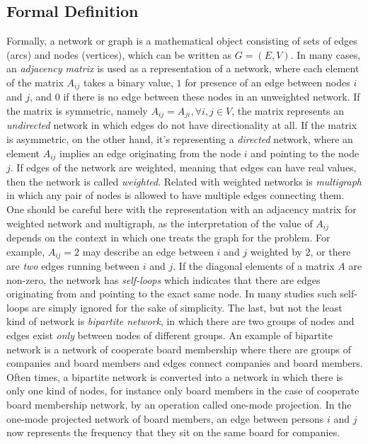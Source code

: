 \documentclass{article}
\begin{document}
	\subsection{Formal Definition}
	Formally, a network or graph is a mathematical object consisting of sets of edges (arcs) and nodes (vertices), which can be written as $G = (E,V)$. In many cases, an \textit{adjacency matrix} is used as a representation of a network, where each element of the matrix $A_{ij}$ takes a binary value, $1$ for presence of an edge between nodes $i$ and $j$, and $0$ if there is no edge between these nodes in an unweighted network.  If the matrix is symmetric, namely $A_{ij} = A_{ji},  \forall i,j \in V$, the matrix represents an \textit{undirected} network in which edges do not have directionality at all. If the matrix is asymmetric, on the other hand, it's representing a \textit{directed} network, where an element $A_{ij}$ implies an edge originating from the node $i$ and pointing to the node $j$. If edges of the network are weighted, meaning that edges can have real values, then the network is called \textit{weighted}. Related with weighted networks is \textit{multigraph} in which any pair of nodes is allowed to have multiple edges connecting them. One should be careful here with the representation with an adjacency matrix for weighted network and multigraph, as the interpretation of the value of $A_{ij}$ depends on the context in which one treats the graph for the problem. For example, $A_{ij} = 2$ may describe an edge between $i$ and $j$ weighted by $2$, or there are \textit{two} edges running between $i$ and $j$. If the diagonal elements of a matrix $A$ are non-zero, the network has \textit{self-loops} which indicates that there are edges originating from and pointing to the exact same node. In many studies such self-loops are simply ignored for the sake of simplicity. The last, but not the least kind of network is \textit{bipartite network}, in which there are two groups of nodes and edges exist \textit{only} between nodes of different groups. An example of bipartite network is a network of cooperate board membership where there are groups of companies and board members and edges connect companies and board members. Often times, a bipartite network is converted into a network in which there is only one kind of nodes, for instance only board members in the case of cooperate board membership network, by an operation called one-mode projection. In the one-mode projected network of board members, an edge between persons $i$ and $j$ now represents the frequency that they sit on the same board for companies.
	
\end{document}
